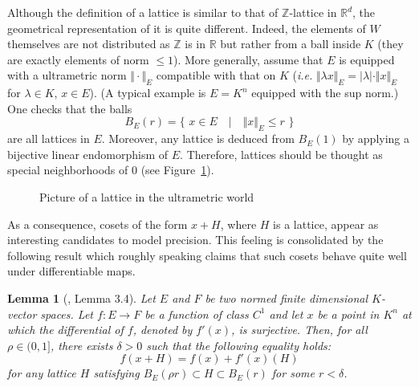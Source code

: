 \documentclass{jT}
\numberwithin{equation}{section}
\newtheorem{lem}[theo]{Lemma}
\theoremstyle{definition}
\newcommand{\Z}{\mathbb Z}
\newcommand{\R}{\mathbb R}
\newcommand{\A}{W}
\begin{document}
Although the definition of a lattice is similar to that of $\Z$-lattice 
in $\R^d$, the geometrical representation of it is quite different. 
Indeed, the elements of $\A$ themselves are not distributed as $\Z$ is 
in $\R$ but rather from a ball inside $K$ (they are exactly elements of 
norm $\leq 1$). More 
generally, assume that $E$ is equipped with a ultrametric norm $\Vert 
\cdot \Vert_E$ compatible with that on $K$ (\emph{i.e.} $\Vert \lambda x 
\Vert_E = |\lambda| \cdot \Vert x \Vert_E$ for $\lambda \in K$, $x \in 
E$). (A typical example is $E = K^n$ equipped with the sup norm.) One
checks that the balls
$$B_E(r) = \big\{ \,\, x \in E \quad\big|\quad \Vert x \Vert_E \leq r \,\,\big\}$$
are all lattices in $E$. Moreover, any lattice is deduced from $B_E(1)$ 
by applying a bijective linear endomorphism of $E$. Therefore, lattices 
should be thought as special neighborhoods of $0$ (see Figure~\ref{fig:lattice}).
%
\begin{figure}
\hfill
{}
\hfill \null

\caption{Picture of a lattice in the ultrametric world}
\label{fig:lattice}
\end{figure}
%
As a consequence, cosets of the form $x + H$, where $H$ is a lattice, 
appear as interesting candidates to model precision. This feeling is 
consolidated by the following result which roughly speaking claims that 
such cosets behave quite well under differentiable maps.

\begin{lem}[\cite{padicprec}, Lemma 3.4]
\label{lem:padicprec}
Let $E$ and $F$ be two normed finite dimensional $K$-vector spaces.
Let $f : E \to F$ be a function of class $C^1$ and let $x$
be a point in $K^n$ at which the differential of $f$, denoted by
$f'(x)$, is surjective.
Then, for all $\rho \in (0,1]$, there exists $\delta > 0$ such that
the following equality holds:
\begin{equation}
\label{eq:padicprec}
f(x + H) = f(x) + f'(x)(H)
\end{equation}
for any lattice $H$ satisfying $B_E(\rho r) \subset H \subset B_E(r)$
for some $r < \delta$.
\end{lem}
\end{document}
